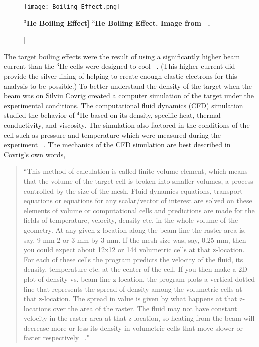 \begin{figure}[!ht]
\begin{center}
\texttt{[image: Boiling\_Effect.png]}
\end{center}
\caption[\bf{$^3$He Boiling Effect}]{
{\bf{$^3$He Boiling Effect.}} Image from ~\cite{Thesis:Ye}.}
\label{fig:boiling_effect}
\end{figure}

The target boiling effects were the result of using a significantly higher beam current than the $^3$He cells were designed to cool ~\cite{dave}. (This higher current did provide the silver lining of helping to create enough elastic electrons for this analysis to be possible.) To better understand the density of the target when the beam was on Silviu Covrig created a computer simulation of the target under the experimental conditions. The computational fluid dynamics (CFD) simulation studied the behavior of $^4$He based on its density, specific heat, thermal conductivity, and viscosity. The simulation also factored in the conditions of the cell such as pressure and temperature which were measured during the experiment ~\cite{density}. The mechanics of the CFD simulation are best described in Covrig's own words, 

\begin{quote}
``This method of calculation is called finite volume element, which means that the volume of the target cell is broken into smaller volumes, a process controlled by the size of the mesh. Fluid dynamics equations, transport equations or equations for any scalar/vector of interest are solved on these elements of volume or computational cells and predictions are made for the fields of temperature, velocity, density etc. in the whole volume of the geometry. At any given z-location along the beam line the raster area is, say, 9 mm 2 or 3 mm by 3 mm. If the mesh size was, say, 0.25 mm, then you could expect about 12x12 or 144 volumetric cells at that z-location. For each of these cells the program predicts the velocity of the fluid, its density, temperature etc. at the center of the cell. If you then make a 2D plot of density vs. beam line z-location, the program plots a vertical dotted line that represents the spread of density among the volumetric cells at that z-location. The spread in value is given by what happens at that z-locations over the area of the raster. The fluid may not have constant velocity in the raster area at that z-location, so heating from the beam will decrease more or less its density in volumetric cells that move slower or faster respectively ~\cite{density}."
\end{quote}


